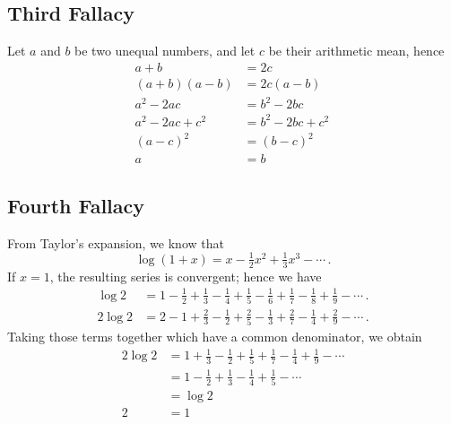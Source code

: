 \documentclass[paper=a4, fontsize=12pt]{scrartcl} %
\theoremstyle{definition}
\theoremstyle{remark}
\begin{document}
\subsection*{\textbf{Third Fallacy}}
Let $a$ and $b$ be two unequal numbers, and let $c$ be their arithmetic mean, hence
\begin{align*}
          a + b &= 2c\,\\
 (a + b)(a - b) &= 2c(a - b)\,\\
      a^2 - 2ac &= b^2 - 2bc\,\\
a^2 - 2ac + c^2 &= b^2 - 2bc + c^2\,\\
      (a - c)^2 &= (b - c)^2\,\\
              a &= b\,
\end{align*}



\subsection*{\textbf{Fourth Fallacy}}
From Taylor's expansion, we know that
\[
  \log(1 + x) = x - \tfrac{1}{2}x^2 + \tfrac{1}{3}x^3 - \dotsb\,.
\]
If $x = 1$, the resulting series is convergent; hence we have
\begin{align*}
  \log 2 &= 1 - \tfrac{1}{2} + \tfrac{1}{3} - \tfrac{1}{4}
+ \tfrac{1}{5} - \tfrac{1}{6} + \tfrac{1}{7} - \tfrac{1}{8}
+ \tfrac{1}{9} - \dotsb\,.  \\
 2 \log 2 &= 2 - 1 + \tfrac{2}{3} - \tfrac{1}{2}
+ \tfrac{2}{5} - \tfrac{1}{3} + \tfrac{2}{7} - \tfrac{1}{4}
+ \tfrac{2}{9} - \dotsb\,.
\end{align*}
Taking those terms together which have a common denominator,
we obtain
\begin{align*}
  2 \log 2 & =  1 + \frac{1}{3} - \frac{1}{2} + \frac{1}{5} +
  \frac{1}{7} - \frac{1}{4} + \frac{1}{9}-\dotsb \\ %
           & =  1 - \frac{1}{2} + \frac{1}{3} - \frac{1}{4} +
  \frac{1}{5}-\dotsb \\
            & =  \log 2\, \\
          2 &= 1\,\\
\end{align*}
\end{document}

